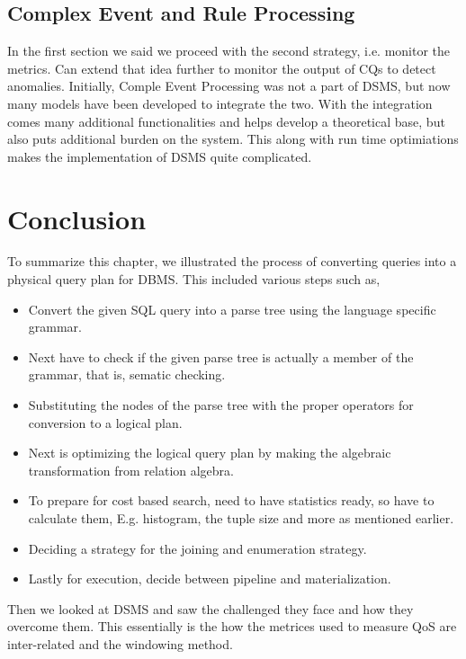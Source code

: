 \subsection{Complex Event and Rule Processing}
In the first section we said we proceed with the second strategy, i.e. monitor the metrics. Can extend that idea further to monitor the output of CQs to detect anomalies. Initially, Comple Event Processing was not a part of DSMS, but now many models have been developed to integrate the two. With the integration comes many additional functionalities and helps develop a theoretical base, but also puts additional burden on the system. This along with run time optimiations makes the implementation of DSMS quite complicated.


\section{Conclusion}
To summarize this chapter, we illustrated the process of converting queries into a physical query plan for DBMS. This included various steps such as, 
\begin{itemize}
    \item Convert the given SQL query into a parse tree using the language specific grammar.
    \item Next have to check if the given parse tree is actually a member of the grammar, that is, sematic checking.
    \item Substituting the nodes of the parse tree with the proper operators for conversion to a logical plan.
    \item Next is optimizing the logical query plan by making the algebraic transformation from relation algebra.
    \item To prepare for cost based search, need to have statistics ready, so have to calculate them, E.g. histogram, the tuple size and more as mentioned earlier.
    \item Deciding a strategy for the joining and enumeration strategy.
    \item Lastly for execution, decide between pipeline and materialization.
\end{itemize}

Then we looked at DSMS and saw the challenged they face and how they overcome them. This essentially is the how the metrices used to measure QoS are inter-related and the windowing method.

